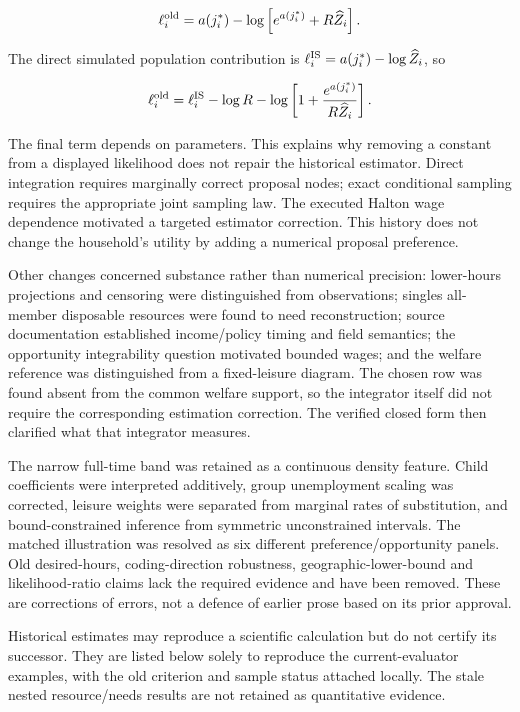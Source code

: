 \documentclass[11pt,a4paper]{article}
\begin{document}
\[\ell_i^{\rm old}=a(j_i^*)-\log\left[e^{a(j_i^*)}+R\widehat Z_i\right].\]

The direct simulated population contribution is \(\ell_i^{\rm IS}=a(j_i^*)-\log\widehat Z_i\), so

\[\ell_i^{\rm old}=\ell_i^{\rm IS}-\log R-
\log\left[1+\frac{e^{a(j_i^*)}}{R\widehat Z_i}\right].\]

The final term depends on parameters. This explains why removing a constant from a displayed likelihood does not repair the historical estimator. Direct integration requires marginally correct proposal nodes; exact conditional sampling requires the appropriate joint sampling law. The executed Halton wage dependence motivated a targeted estimator correction. This history does not change the household's utility by adding a numerical proposal preference.

Other changes concerned substance rather than numerical precision: lower-hours projections and censoring were distinguished from observations; singles all-member disposable resources were found to need reconstruction; source documentation established income/policy timing and field semantics; the opportunity integrability question motivated bounded wages; and the welfare reference was distinguished from a fixed-leisure diagram. The chosen row was found absent from the common welfare support, so the integrator itself did not require the corresponding estimation correction. The verified closed form then clarified what that integrator measures.

The narrow full-time band was retained as a continuous density feature. Child coefficients were interpreted additively, group unemployment scaling was corrected, leisure weights were separated from marginal rates of substitution, and bound-constrained inference from symmetric unconstrained intervals. The matched illustration was resolved as six different preference/opportunity panels. Old desired-hours, coding-direction robustness, geographic-lower-bound and likelihood-ratio claims lack the required evidence and have been removed. These are corrections of errors, not a defence of earlier prose based on its prior approval.

Historical estimates may reproduce a scientific calculation but do not certify its successor. They are listed below solely to reproduce the current-evaluator examples, with the old criterion and sample status attached locally. The stale nested resource/needs results are not retained as quantitative evidence.
\end{document}
